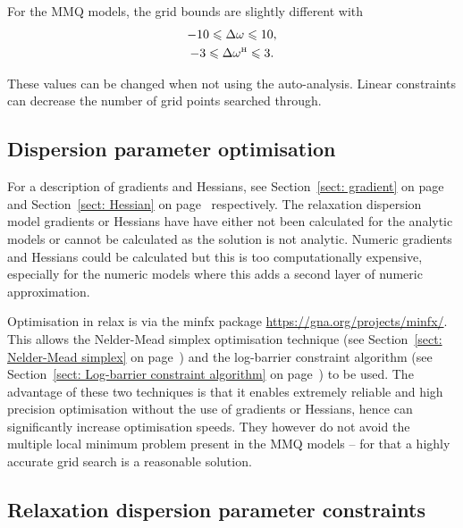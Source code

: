 For the MMQ models, the grid bounds are slightly different with
\begin{subequations}
\begin{gather} 
    -10 \leqslant \Delta\omega \leqslant 10, \\
    -3 \leqslant \Delta\omega^{\scriptscriptstyle\mathrm{H}} \leqslant 3.
\end{gather} 
\end{subequations}

These values can be changed when not using the auto-analysis.
Linear constraints can decrease the number of grid points searched through.




\subsection{Dispersion parameter optimisation}

For a description of gradients and Hessians, see Section~\ref{sect: gradient} on page~\pageref{sect: gradient} and Section~\ref{sect: Hessian} on page~\pageref{sect: Hessian} respectively.
The relaxation dispersion model gradients or Hessians have have either not been calculated for the analytic models or cannot be calculated as the solution is not analytic.
Numeric gradients and Hessians could be calculated but this is too computationally expensive, especially for the numeric models where this adds a second layer of numeric approximation.

Optimisation in relax is via the minfx package \url{https://gna.org/projects/minfx/}.
This allows the Nelder-Mead simplex optimisation technique (see Section~\ref{sect: Nelder-Mead simplex} on page~\pageref{sect: Nelder-Mead simplex}) and the log-barrier constraint algorithm (see Section~\ref{sect: Log-barrier constraint algorithm} on page~\pageref{sect: Log-barrier constraint algorithm}) to be used.
The advantage of these two techniques is that it enables extremely reliable and high precision optimisation without the use of gradients or Hessians, hence can significantly increase optimisation speeds.
They however do not avoid the multiple local minimum problem present in the MMQ models -- for that a highly accurate grid search is a reasonable solution.



\subsection{Relaxation dispersion parameter constraints}

